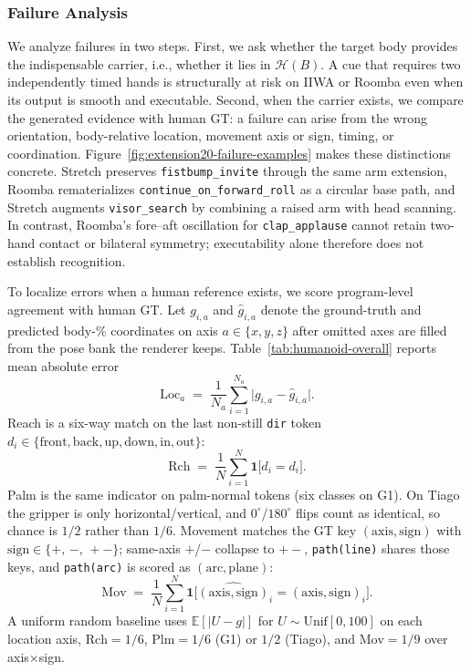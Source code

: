 \documentclass[letterpaper,10pt,conference]{ieeeconf}
\begin{document}
\subsubsection{Failure Analysis}
We analyze failures in two steps. First, we ask whether the target body provides the indispensable carrier, i.e., whether it lies in $\mathcal{H}(B)$. A cue that requires two independently timed hands is structurally at risk on IIWA or Roomba even when its output is smooth and executable. Second, when the carrier exists, we compare the generated evidence with human GT: a failure can arise from the wrong orientation, body-relative location, movement axis or sign, timing, or coordination. Figure~\ref{fig:extension20-failure-examples} makes these distinctions concrete. Stretch preserves \texttt{fistbump\_invite} through the same arm extension, Roomba rematerializes \texttt{continue\_on\_forward\_roll} as a circular base path, and Stretch augments \texttt{visor\_search} by combining a raised arm with head scanning. In contrast, Roomba's fore--aft oscillation for \texttt{clap\_applause} cannot retain two-hand contact or bilateral symmetry; executability alone therefore does not establish recognition.

To localize errors when a human reference exists, we score program-level agreement with human GT.
Let $g_{i,a}$ and $\hat{g}_{i,a}$ denote the ground-truth and predicted body-\% coordinates on axis $a\in\{x,y,z\}$ after omitted axes are filled from the pose bank the renderer keeps.
Table~\ref{tab:humanoid-overall} reports mean absolute error
\begin{equation}
\mathrm{Loc}_a \;=\; \frac{1}{N_a}\sum_{i=1}^{N_a}\bigl|g_{i,a}-\hat{g}_{i,a}\bigr|.
\end{equation}
Reach is a six-way match on the last non-still \texttt{dir} token $d_i\in\{\mathrm{front},\mathrm{back},\mathrm{up},\mathrm{down},\mathrm{in},\mathrm{out}\}$:
\begin{equation}
\mathrm{Rch} \;=\; \frac{1}{N}\sum_{i=1}^{N}\mathbf{1}\bigl[\hat{d}_i=d_i\bigr].
\end{equation}
Palm is the same indicator on palm-normal tokens (six classes on G1).
On Tiago the gripper is only horizontal/vertical, and $0^\circ$/$180^\circ$ flips count as identical, so chance is $1/2$ rather than $1/6$.
Movement matches the GT key $(\mathrm{axis},\mathrm{sign})$ with $\mathrm{sign}\in\{+,\,-,\,{+}{-}\}$; same-axis $+$/$-$ collapse to ${+}{-}$, \texttt{path(line)} shares those keys, and \texttt{path(arc)} is scored as $(\mathrm{arc},\mathrm{plane})$:
\begin{equation}
\mathrm{Mov} \;=\; \frac{1}{N}\sum_{i=1}^{N}\mathbf{1}\bigl[\widehat{(\mathrm{axis},\mathrm{sign})}_i=(\mathrm{axis},\mathrm{sign})_i\bigr].
\end{equation}
A uniform random baseline uses $\mathbb{E}[|U-g|]$ for $U\sim\mathrm{Unif}[0,100]$ on each location axis, $\mathrm{Rch}=1/6$, $\mathrm{Plm}=1/6$ (G1) or $1/2$ (Tiago), and $\mathrm{Mov}=1/9$ over axis$\times$sign.
\end{document}
